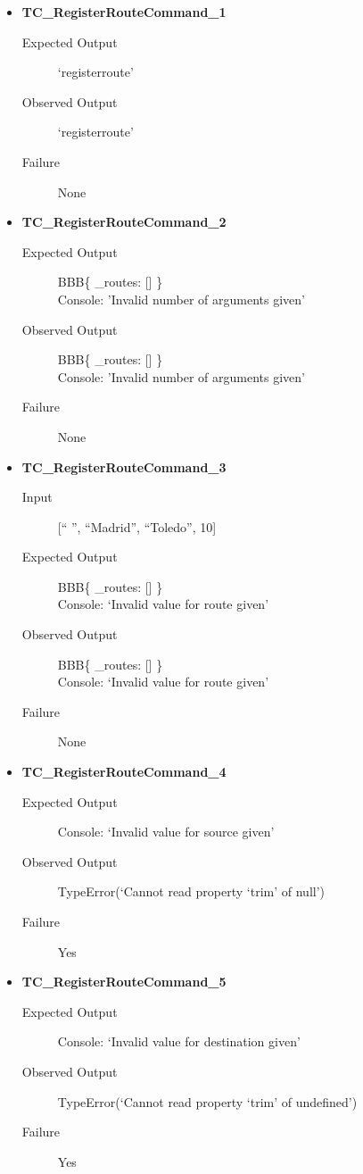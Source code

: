\documentclass[11pt]{article}
\begin{document}
\begin{itemize}
\item \textbf{TC\_RegisterRouteCommand\_1}
\begin{description}
\item[{Expected Output}] ‘registerroute’
\item[{Observed Output}] ‘registerroute’
\item[{Failure}] None
\end{description}

\item \textbf{TC\_RegisterRouteCommand\_2}
\begin{description}
\item[{Expected Output}] BBB\{ \_routes: [] \}\\
Console: ’Invalid number of arguments given’
\item[{Observed Output}] BBB\{ \_routes: [] \}\\
Console: ’Invalid number of arguments given’
\item[{Failure}] None
\end{description}

\item \textbf{TC\_RegisterRouteCommand\_3}
\begin{description}
\item[{Input}] [“ ”, “Madrid”, “Toledo”, 10]
\item[{Expected Output}] BBB\{ \_routes: [] \}\\
Console: ‘Invalid value for route given’
\item[{Observed Output}] BBB\{ \_routes: [] \}\\
Console: ‘Invalid value for route given’
\item[{Failure}] None
\end{description}

\item \textbf{TC\_RegisterRouteCommand\_4}
\begin{description}
\item[{Expected Output}] Console: ‘Invalid value for source given’
\item[{Observed Output}] TypeError(‘Cannot read property ‘trim’ of null’)
\item[{Failure}] Yes
\end{description}

\item \textbf{TC\_RegisterRouteCommand\_5}
\begin{description}
\item[{Expected Output}] Console: ‘Invalid value for destination given’
\item[{Observed Output}] TypeError(‘Cannot read property ‘trim’ of undefined’)
\item[{Failure}] Yes
\end{description}


\end{itemize}
\end{document}
